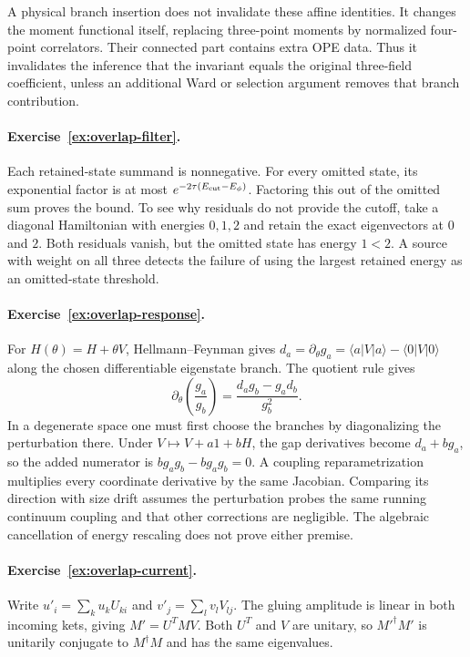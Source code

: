 A physical branch insertion does not invalidate these affine
identities. It changes the moment functional itself, replacing
three-point moments by normalized four-point correlators.
Their connected part contains extra OPE data. Thus it invalidates
the inference that the invariant equals the original three-field
coefficient, unless an additional Ward or selection argument
removes that branch contribution.



\paragraph{Exercise~\ref{ex:overlap-filter}.}
\label{sol:ex:overlap-filter}
Each retained-state summand is nonnegative. For every omitted
state, its exponential factor is at most
$e^{-2\tau(E_{\rm cut}-E_\phi)}$. Factoring this out of the
omitted sum proves the bound. To see why residuals do not provide
the cutoff, take a diagonal Hamiltonian with energies $0,1,2$
and retain the exact eigenvectors at $0$ and $2$. Both residuals
vanish, but the omitted state has energy $1<2$. A source with
weight on all three detects the failure of using the largest
retained energy as an omitted-state threshold.



\paragraph{Exercise~\ref{ex:overlap-response}.}
\label{sol:ex:overlap-response}
For $H(\theta)=H+\theta V$, Hellmann--Feynman gives
$d_a=\partial_\theta g_a=\langle a|V|a\rangle-\langle0|V|0\rangle$
along the chosen differentiable eigenstate branch. The quotient rule gives
\[
 \partial_\theta\!\left(\frac{g_a}{g_b}\right)
 =\frac{d_ag_b-g_ad_b}{g_b^2}.
\]
In a degenerate space one must first choose the branches by diagonalizing
the perturbation there. Under $V\mapsto V+a1+bH$, the gap derivatives
become $d_a+bg_a$, so the added numerator is
$bg_ag_b-bg_ag_b=0$. A coupling reparametrization multiplies
every coordinate derivative by the same Jacobian. Comparing
its direction with size drift assumes the perturbation probes
the same running continuum coupling and that other corrections
are negligible. The algebraic cancellation of energy rescaling
does not prove either premise.



\paragraph{Exercise~\ref{ex:overlap-current}.}
\label{sol:ex:overlap-current}
Write $u'_i=\sum_k u_kU_{ki}$ and
$v'_j=\sum_l v_lV_{lj}$. The gluing amplitude is linear in
both incoming kets, giving $M'=U^TMV$. Both $U^T$ and $V$
are unitary, so $M'^\dagger M'$ is unitarily conjugate to
$M^\dagger M$ and has the same eigenvalues.

